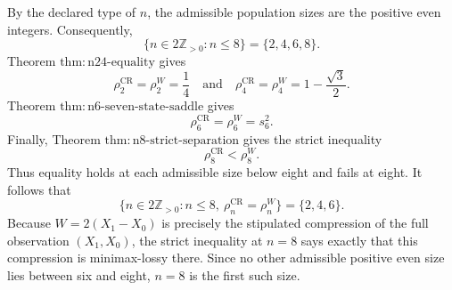 By the declared type of \(n\), the admissible population sizes are the positive even integers.  Consequently,
\[
 \{n\in 2\mathbb Z_{>0}:n\leq 8\}=\{2,4,6,8\}.
\]
Theorem \(\mathrm{thm{:}n24\mbox{-}equality}\) gives
\[
 \rho_2^{\mathrm{CR}}=\rho_2^W=\frac14
 \quad\text{and}\quad
 \rho_4^{\mathrm{CR}}=\rho_4^W=1-\frac{\sqrt3}{2}.
\]
Theorem \(\mathrm{thm{:}n6\mbox{-}seven\mbox{-}state\mbox{-}saddle}\) gives
\[
 \rho_6^{\mathrm{CR}}=\rho_6^W=s_6^2.
\]
Finally, Theorem \(\mathrm{thm{:}n8\mbox{-}strict\mbox{-}separation}\) gives the strict inequality
\[
 \rho_8^{\mathrm{CR}}<\rho_8^W.
\]
Thus equality holds at each admissible size below eight and fails at eight.  It follows that
\[
 \{n\in 2\mathbb Z_{>0}:n\leq8,\ \rho_n^{\mathrm{CR}}=\rho_n^W\}
 =\{2,4,6\}.
\]
Because \(W=2(X_1-X_0)\) is precisely the stipulated compression of the full observation \((X_1,X_0)\), the strict inequality at \(n=8\) says exactly that this compression is minimax-lossy there.  Since no other admissible positive even size lies between six and eight, \(n=8\) is the first such size.
